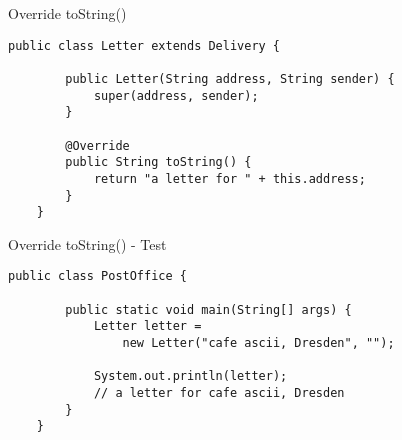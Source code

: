 \begin{frame}[fragile]{Override toString()}
	\begin{lstlisting}[escapechar=!]
	public class Letter extends Delivery {

	    public Letter(String address, String sender) {
	        super(address, sender);
	    }
	
	    @Override
	    public String toString() {
	        return "a letter for " + this.address;
	    }	
	}
	\end{lstlisting}
\end{frame}

\begin{frame}[fragile]{Override toString() - Test}
	\begin{lstlisting}[escapechar=!]
	public class PostOffice {
	    
	    public static void main(String[] args) {	    
	        Letter letter = 
	            new Letter("cafe ascii, Dresden", "");
	        
	        System.out.println(letter);
	        // a letter for cafe ascii, Dresden
	    }
	}
	\end{lstlisting}
\end{frame}


